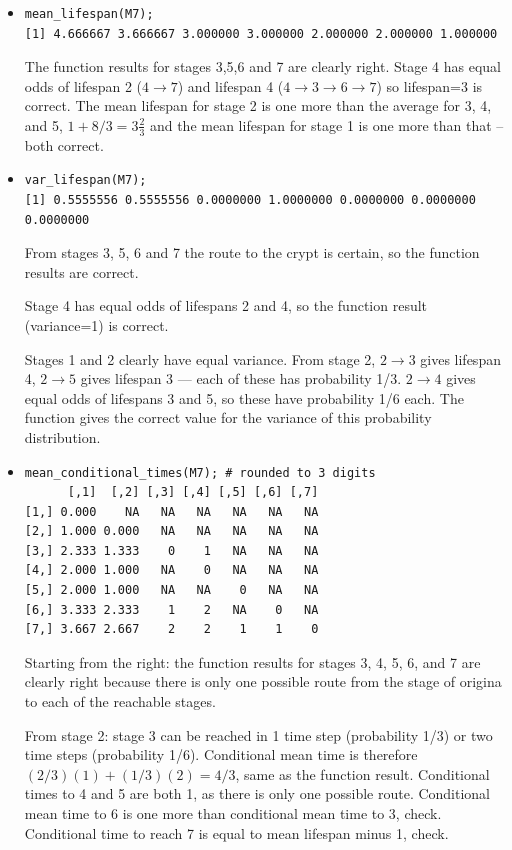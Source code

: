 \documentclass[12pt]{article}
\begin{document}
\begin{itemize} 
\item 
\begin{verbatim} 
mean_lifespan(M7); 
[1] 4.666667 3.666667 3.000000 3.000000 2.000000 2.000000 1.000000
\end{verbatim} 
The function results for stages 3,5,6 and 7 are clearly right. Stage 4 has equal odds of lifespan 2 ($4 \to 7$) and
lifespan 4 ($4 \to 3 \to 6 \to 7$) so lifespan=3 is correct. The mean lifespan for stage 2 is one more
than the average for 3, 4, and 5, $1 + 8/3 = 3\frac{2}{3}$ and the mean lifespan for stage 1 is one more
than that -- both correct. 

\item 
\begin{verbatim} 
var_lifespan(M7); 
[1] 0.5555556 0.5555556 0.0000000 1.0000000 0.0000000 0.0000000 0.0000000
\end{verbatim} 
From stages 3, 5, 6 and 7 the route to the crypt is certain, so the function results are correct.  

Stage 4 has equal odds of lifespans 2 and 4, so the function result (variance=1) is correct. 

Stages 1 and 2 clearly have equal variance. From stage 2, $2 \to 3$ gives lifespan 4, $2 \to 5$ 
gives lifespan 3 --- each of these has probability 1/3. $2 \to 4$ gives equal odds of lifespans 
3 and 5, so these have probability 1/6 each. The function gives the correct value for the 
variance of this probability distribution. 

\item 
\begin{verbatim} 
mean_conditional_times(M7); # rounded to 3 digits  
      [,1]  [,2] [,3] [,4] [,5] [,6] [,7]
[1,] 0.000    NA   NA   NA   NA   NA   NA
[2,] 1.000 0.000   NA   NA   NA   NA   NA
[3,] 2.333 1.333    0    1   NA   NA   NA
[4,] 2.000 1.000   NA    0   NA   NA   NA
[5,] 2.000 1.000   NA   NA    0   NA   NA
[6,] 3.333 2.333    1    2   NA    0   NA
[7,] 3.667 2.667    2    2    1    1    0
\end{verbatim} 
Starting from the right: the function results for stages 3, 4, 5, 6, and 7 are clearly right because
there is only one possible route from the stage of origina to each of the reachable stages. 

From stage 2: stage 3 can be reached in 1 time step (probability 1/3) or two time steps (probability 1/6). 
Conditional mean time is therefore $(2/3)(1) + (1/3)(2) = 4/3$, same as the function result. Conditional
times to 4 and 5 are both 1, as there is only one possible route. Conditional mean time to 6 is one more than
conditional mean time to 3, check. Conditional time to reach 7 is equal to mean lifespan minus 1, check. 


\end{itemize}
\end{document}

